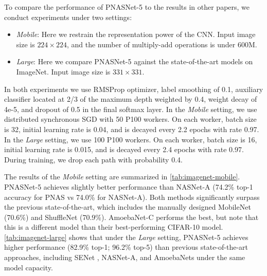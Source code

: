 \documentclass[runningheads]{llncs}
\begin{document}
To compare the performance of PNASNet-5 
to the results in other papers,
we conduct experiments under two settings:
\begin{itemize}
    \item \textit{Mobile}: Here we restrain the representation power of the CNN.
    Input image size is $224 \times 224$, and the number of multiply-add operations is under 600M.
    \item \textit{Large}: Here we compare PNASNet-5 against the state-of-the-art models on ImageNet.
    Input image size is $331 \times 331$.
\end{itemize}In both experiments we use RMSProp optimizer, label smoothing of 0.1, auxiliary classifier located at 2/3 of the maximum depth weighted by 0.4, weight decay of 4e-5,
and dropout of 0.5 in the final softmax layer.
In the \textit{Mobile} setting, we use distributed synchronous SGD with 50 P100 workers.
On each worker, batch size is 32, initial learning rate is 0.04, and is decayed every 2.2 epochs with rate 0.97.
In the \textit{Large} setting, we use 100 P100 workers.
On each worker, batch size is 16, initial learning rate is 0.015, and is decayed every 2.4 epochs with rate 0.97.
During training, we drop each path with probability 0.4.



The results of the \textit{Mobile} setting are summarized in \cref{tab:imagenet-mobile}.
PNASNet-5 achieves slightly better performance than NASNet-A (74.2\% top-1 accuracy for PNAS vs 74.0\% for NASNet-A).
Both methods significantly surpass
the previous state-of-the-art,
which includes the manually
designed MobileNet \cite{DBLP:journals/corr/HowardZCKWWAA17} (70.6\%)
and ShuffleNet \cite{DBLP:journals/corr/ZhangZLS17} (70.9\%).
AmoebaNet-C performs the best, but note that this is a different model than their best-performing CIFAR-10 model.
\cref{tab:imagenet-large} shows that under the \textit{Large} setting, PNASNet-5 achieves higher performance (82.9\% top-1; 96.2\% top-5) than previous state-of-the-art approaches,
including SENet \cite{DBLP:journals/corr/abs-1709-01507}, NASNet-A, and AmoebaNets under the same model capacity.
\end{document}
